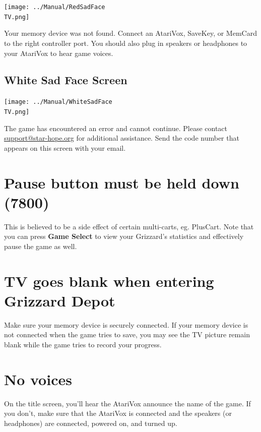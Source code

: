 \documentclass[10pt,twocolumn,openany,article]{memoir}
\newcommand\TV{NTSC}
\newcommand\TV{PAL}
\newcommand\TV{SECAM}
\begin{document}
\begin{description}
\texttt{[image: ../Manual/RedSadFace\\TV.png]}

Your  memory device  was not  found.  Connect an  AtariVox, SaveKey,  or
MemCard to the  right controller port. You should also  plug in speakers
or headphones to your AtariVox to hear game voices.

\fi\fi

\subsection{White Sad Face Screen}

\texttt{[image: ../Manual/WhiteSadFace\\TV.png]}

The game  has encountered an  error and cannot continue.  Please contact
\href{mailto:support@star-hope.org}{support@star-hope.org}           for
additional assistance. Send the code  number that appears on this screen
with your email.

\ifdefined\ATARIAGESAVE\else

\section{Pause button must be held down (7800)}

This  is believed  to  be  a side  effect  of  certain multi-carts,  eg.
PlusCart.  Note that  you can  press \textbf{Game  Select} to  view your
Grizzard's statistics and effectively pause the game as well.

\fi

\ifdefined\NOSAVE\else\ifdefined\ATARIAGESAVE\else

\section{TV goes blank when entering Grizzard Depot}

Make  sure your  memory device  is  securely connected.  If your  memory
device is not connected when the game  tries to save, you may see the TV
picture remain blank while the game tries to record your progress.

\fi

\section{No voices}

On the title  screen, you'll hear the AtariVox announce  the name of the
game. If  you don't, make  sure that the  AtariVox is connected  and the
speakers (or headphones) are connected, powered on, and turned up.


\end{description}
\end{document}
